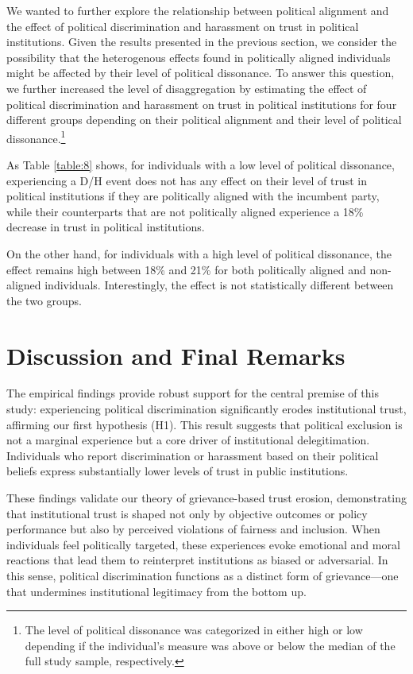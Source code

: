 \documentclass{article}
\begin{document}
 

We wanted to further explore the relationship between political alignment and the effect of political discrimination and harassment on trust in political institutions. Given the results presented in the previous section, we consider the possibility that the heterogenous effects found in politically aligned individuals might be affected by their level of political dissonance. To answer this question, we further increased the level of disaggregation by estimating the effect of political discrimination and harassment on trust in political institutions for four different groups depending on their political alignment and their level of political dissonance.\footnote{The level of political dissonance was categorized in either high or low depending if the individual's measure was above or below the median of the full study sample, respectively.}

As Table \ref{table:8} shows, for individuals with a low level of political dissonance, experiencing a D/H event does not has any effect on their level of trust in political institutions if they are politically aligned with the incumbent party, while their counterparts that are not politically aligned experience a 18\% decrease in trust in political institutions.

On the other hand, for individuals with a high level of political dissonance, the effect remains high between 18\% and 21\% for both politically aligned and non-aligned individuals. Interestingly, the effect is not statistically different between the two groups.

 

\section{Discussion and Final Remarks}

The empirical findings provide robust support for the central premise of this study: experiencing political discrimination significantly erodes institutional trust, affirming our first hypothesis (H1). This result suggests that political exclusion is not a marginal experience but a core driver of institutional delegitimation. Individuals who report discrimination or harassment based on their political beliefs express substantially lower levels of trust in public institutions.

These findings validate our theory of grievance-based trust erosion, demonstrating that institutional trust is shaped not only by objective outcomes or policy performance but also by perceived violations of fairness and inclusion. When individuals feel politically targeted, these experiences evoke emotional and moral reactions that lead them to reinterpret institutions as biased or adversarial. In this sense, political discrimination functions as a distinct form of grievance—one that undermines institutional legitimacy from the bottom up.
\end{document}
